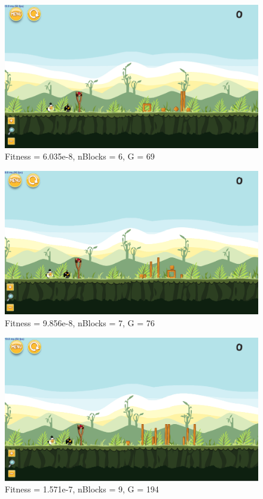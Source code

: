 \begin{figure}[H]
	\centering
	\includegraphics[scale=0.35]{gfx/e3/level-0-second_crossover180613_024124.png}
	\caption{Fitness = 6.035e-8, nBlocks = 6, G = 69 }\label{f:e3-2}
\end{figure}

\begin{figure}[H]
	\centering
	\includegraphics[scale=0.35]{gfx/e3/level-0-second_crossover180613_041716.png}
	\caption{Fitness = 9.856e-8, nBlocks = 7, G = 76 }\label{f:e3-3}
\end{figure}

\begin{figure}[H]
	\centering
	\includegraphics[scale=0.35]{gfx/e3/level-0-second_crossover180613_055622.png}
	\caption{Fitness = 1.571e-7, nBlocks = 9, G = 194  }\label{f:e3-4}
\end{figure}
